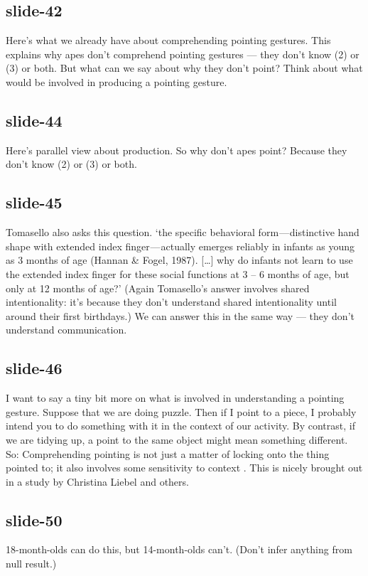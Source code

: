 \documentclass[12pt,\papersize]{extarticle}
\begin{document}
 
\subsection{slide-42}
Here's what we already have about comprehending pointing gestures.
This explains why apes don't comprehend pointing gestures --- they don't know (2) or (3) or both.
But what can we say about why they don't point? Think about what would be involved in producing a pointing gesture.
 
 
\subsection{slide-44}
Here's parallel view about production.
So why don't apes point?
Because they don't know (2) or (3) or both.
 
 
\subsection{slide-45}
Tomasello also asks this question.
‘the specific behavioral form — distinctive hand shape with extended index finger — actually emerges reliably in infants as young as 3 months of age (Hannan \& Fogel, 1987). […] why do infants not learn to use the extended index finger for these social functions at 3 – 6 months of age, but only at 12 months of age?’ \citep[p.\ 716]{Tomasello:2007fi}
(Again Tomasello's answer involves shared intentionality: it's because they don't understand shared intentionality until around their first birthdays.)
We can answer this in the same way --- they don't understand communication.
 
 
\subsection{slide-46}
I want to say a tiny bit more on what is involved in understanding a pointing gesture.
Suppose that we are doing puzzle. Then if I point to a piece, I probably intend you to do something with it in the context of our activity.
By contrast, if we are tidying up, a point to the same object might mean something different.
So:
Comprehending pointing is not just a matter of locking onto the thing pointed to; it also involves some sensitivity to context \citep[see][]{Liebal:2010lr}.
This is nicely brought out in a study by Christina Liebel and others.
 
 
\subsection{slide-50}
18-month-olds can do this, but 14-month-olds can't. (Don't infer anything from null result.)
 
\end{document}
